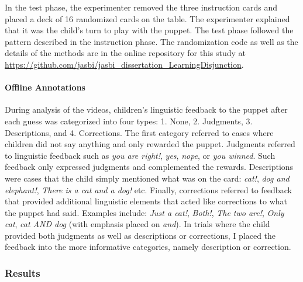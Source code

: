 \documentclass[man]{apa6}
\theoremstyle{definition}
\theoremstyle{definition}
\theoremstyle{definition}
\theoremstyle{remark}
\begin{document}
In the test phase, the experimenter removed the three instruction cards
and placed a deck of 16 randomized cards on the table. The experimenter
explained that it was the child's turn to play with the puppet. The test
phase followed the pattern described in the instruction phase. The
randomization code as well as the details of the methods are in the
online repository for this study at
\href{https://github.com/jasbi/jasbi_dissertation_LearningDisjunction/tree/master/connective_comprehension/study2/0_methods}{https://github.com/jasbi/jasbi\_dissertation\_LearningDisjunction}.

\paragraph{Offline Annotations}\label{feedbackCoding}

During analysis of the videos, children's linguistic feedback to the
puppet after each guess was categorized into four types: 1. None, 2.
Judgments, 3. Descriptions, and 4. Corrections. The first category
referred to cases where children did not say anything and only rewarded
the puppet. Judgments referred to linguistic feedback such as \emph{you
are right!}, \emph{yes}, \emph{nope}, or \emph{you winned}. Such
feedback only expressed judgments and complemented the rewards.
Descriptions were cases that the child simply mentioned what was on the
card: \emph{cat!}, \emph{dog and elephant!}, \emph{There is a cat and a
dog!} etc. Finally, corrections referred to feedback that provided
additional linguistic elements that acted like corrections to what the
puppet had said. Examples include: \emph{Just a cat!}, \emph{Both!},
\emph{The two are!}, \emph{Only cat}, \emph{cat AND dog} (with emphasis
placed on \emph{and}). In trials where the child provided both judgments
as well as descriptions or corrections, I placed the feedback into the
more informative categories, namely description or correction.

\subsubsection{Results}\label{results-1}
\end{document}
